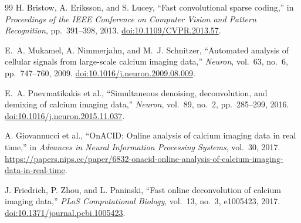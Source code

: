 \documentclass[11pt]{article}
\begin{document}
\begin{thebibliography}{99}
H. Bristow, A. Eriksson, and S. Lucey,
``Fast convolutional sparse coding,''
in \emph{Proceedings of the IEEE Conference on Computer Vision and Pattern
Recognition}, pp.~391--398, 2013.
\href{https://doi.org/10.1109/CVPR.2013.57}{doi:10.1109/CVPR.2013.57}.

E.~A. Mukamel, A. Nimmerjahn, and M.~J. Schnitzer,
``Automated analysis of cellular signals from large-scale calcium imaging
data,''
\emph{Neuron}, vol.~63, no.~6, pp.~747--760, 2009.
\href{https://doi.org/10.1016/j.neuron.2009.08.009}{doi:10.1016/j.neuron.2009.08.009}.

E.~A. Pnevmatikakis et al.,
``Simultaneous denoising, deconvolution, and demixing of calcium imaging data,''
\emph{Neuron}, vol.~89, no.~2, pp.~285--299, 2016.
\href{https://doi.org/10.1016/j.neuron.2015.11.037}{doi:10.1016/j.neuron.2015.11.037}.

A. Giovannucci et al.,
``OnACID: Online analysis of calcium imaging data in real time,''
in \emph{Advances in Neural Information Processing Systems}, vol.~30, 2017.
\url{https://papers.nips.cc/paper/6832-onacid-online-analysis-of-calcium-imaging-data-in-real-time}.

J. Friedrich, P. Zhou, and L. Paninski,
``Fast online deconvolution of calcium imaging data,''
\emph{PLoS Computational Biology}, vol.~13, no.~3, e1005423, 2017.
\href{https://doi.org/10.1371/journal.pcbi.1005423}{doi:10.1371/journal.pcbi.1005423}.

\end{thebibliography}
\end{document}
